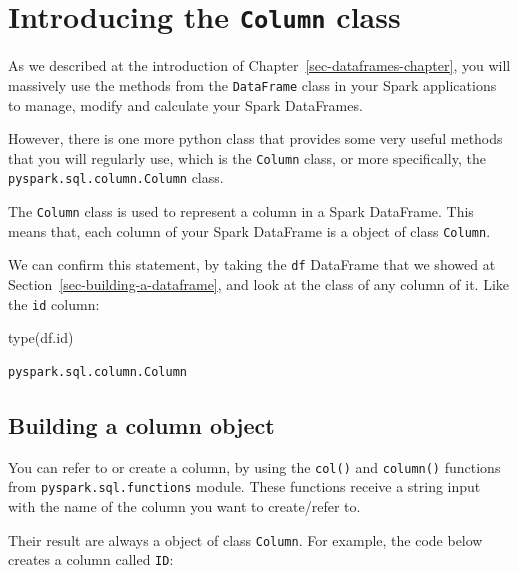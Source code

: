 \documentclass[
  11pt,
  letterpaper,
  DIV=11,
  numbers=noendperiod]{scrreprt}
\newenvironment{Shaded}{\begin{snugshade}}{\end{snugshade}}
\newcommand{\BuiltInTok}[1]{\textcolor[rgb]{0.00,0.23,0.31}{#1}}
\newcommand{\NormalTok}[1]{\textcolor[rgb]{0.00,0.23,0.31}{#1}}
\begin{document}

\hypertarget{introducing-the-column-class}{%
\chapter{\texorpdfstring{Introducing the \texttt{Column}
class}{Introducing the Column class}}\label{introducing-the-column-class}}

As we described at the introduction of
Chapter~\ref{sec-dataframes-chapter}, you will massively use the methods
from the \texttt{DataFrame} class in your Spark applications to manage,
modify and calculate your Spark DataFrames.

However, there is one more python class that provides some very useful
methods that you will regularly use, which is the \texttt{Column} class,
or more specifically, the \texttt{pyspark.sql.column.Column} class.

The \texttt{Column} class is used to represent a column in a Spark
DataFrame. This means that, each column of your Spark DataFrame is a
object of class \texttt{Column}.

We can confirm this statement, by taking the \texttt{df} DataFrame that
we showed at Section~\ref{sec-building-a-dataframe}, and look at the
class of any column of it. Like the \texttt{id} column:

\begin{Shaded}
\begin{Highlighting}[]
\BuiltInTok{type}\NormalTok{(df.}\BuiltInTok{id}\NormalTok{)}
\end{Highlighting}
\end{Shaded}

\begin{verbatim}
pyspark.sql.column.Column
\end{verbatim}

\hypertarget{building-a-column-object}{%
\section{Building a column object}\label{building-a-column-object}}

You can refer to or create a column, by using the \texttt{col()} and
\texttt{column()} functions from \texttt{pyspark.sql.functions} module.
These functions receive a string input with the name of the column you
want to create/refer to.

Their result are always a object of class \texttt{Column}. For example,
the code below creates a column called \texttt{ID}:
\end{document}
